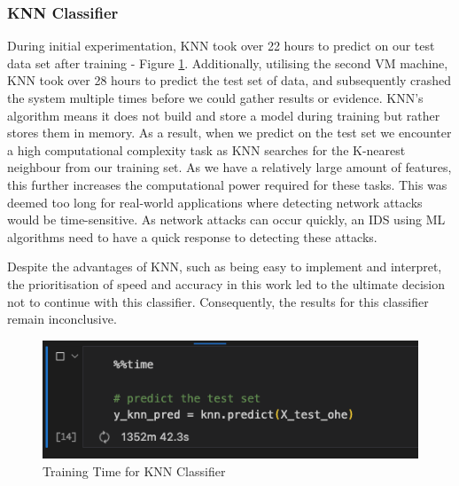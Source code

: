 \subsubsection{KNN Classifier}

During initial experimentation, KNN took over 22 hours to predict on our test data set after training - Figure \ref{fig:knn_train}. Additionally, utilising the second VM machine, KNN took over 28 hours to predict the test set of data, and subsequently crashed the system multiple times before we could gather results or evidence. KNN's algorithm means it does not build and store a model during training but rather stores them in memory. As a result, when we predict on the test set we encounter a high computational complexity task as KNN searches for the K-nearest neighbour from our training set. As we have a relatively large amount of features, this further increases the computational power required for these tasks. This was deemed too long for real-world applications where detecting network attacks would be time-sensitive. As network attacks can occur quickly, an IDS using ML algorithms need to have a quick response to detecting these attacks.

Despite the advantages of KNN, such as being easy to implement and interpret, the prioritisation of speed and accuracy in this work led to the ultimate decision not to continue with this classifier. Consequently, the results for this classifier remain inconclusive.

\medskip

\begin{figure}[h]
\caption{Training Time for KNN Classifier}
\label{fig:knn_train}
\centering
\includegraphics[width=\textwidth]{Appendices/Images/knn_predict-2023-04-15.png}
\end{figure}